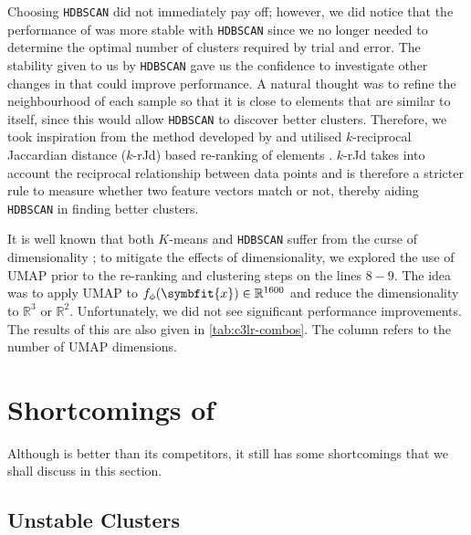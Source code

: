 Choosing \texttt{HDBSCAN} did not immediately pay off; however, we did notice that the performance of \ccclr{} was more stable with \texttt{HDBSCAN} since we no longer needed to determine the optimal number of clusters required by trial and error. 
The stability given to us by \texttt{HDBSCAN} gave us the confidence to investigate other changes in \ccclr{} that could improve performance. A natural thought was to refine the neighbourhood of each sample so that it is close to elements that are similar to itself, since this would allow \texttt{HDBSCAN} to discover better clusters. Therefore, we took inspiration from the method developed by \textcite{Ji2019UnsupervisedTraining} and utilised $k$-reciprocal Jaccardian distance ($k$-rJd) based re-ranking of elements \parencite{ZhongRe-rankingEncoding}. $k$-rJd takes into account the reciprocal relationship between data points and is therefore a stricter rule to measure whether two feature vectors match or not, thereby aiding \texttt{HDBSCAN} in finding better clusters.

It is well known that both $K$-means and \texttt{HDBSCAN} suffer from the curse of dimensionality \parencite{Kriegel09, McInnes2017Hdbscan:Clustering}; to mitigate the effects of dimensionality, we explored the use of UMAP \parencite{mcinnes2018umap} prior to the re-ranking and clustering steps on the lines $8-9$.
The idea was to apply UMAP to $f_\phi(\symbfit{x}) \in \mathbb{R}^{1600}$ and reduce the dimensionality to $\mathbb{R}^3$ or $\mathbb{R}^2$.
Unfortunately, we did not see significant performance improvements. The results of this are also given in \cref{tab:c3lr-combos}. The column  refers to the number of UMAP dimensions.

\section{Shortcomings of \ccclr{}}\label{sec:c3lr-shortcomes}

Although \ccclr{} is better than its competitors, it still has some shortcomings that we shall discuss in this section.

\subsection{Unstable Clusters}\label{ssec:unstable-clusters}

